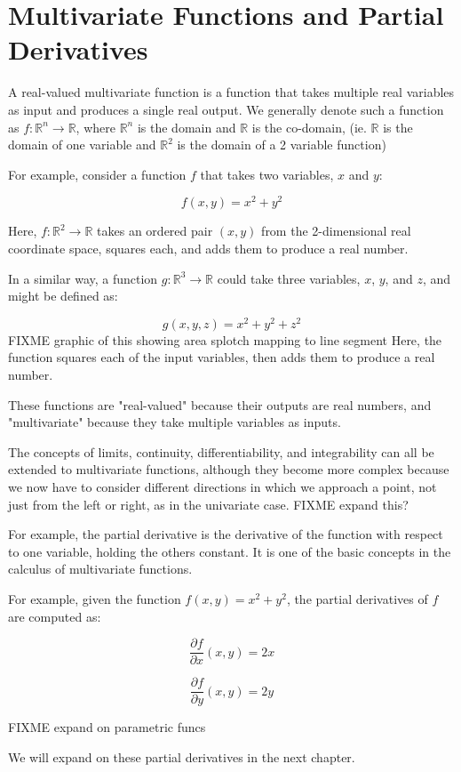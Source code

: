 \chapter{Multivariate Functions and Partial Derivatives}

A real-valued multivariate function is a function that takes multiple
real variables as input and produces a single real output.
We generally denote such a function as $f: \mathbb{R}^n \rightarrow
\mathbb{R}$, where $\mathbb{R}^n$ is the domain and $\mathbb{R}$ is
the co-domain, (ie. $\mathbb{R}$ is the domain of one variable and $\mathbb{R}^2$ is the domain of a 2 variable function)

For example, consider a function $f$ that takes two variables, $x$ and
$y$:

\begin{equation*}
f(x, y) = x^2 + y^2
\end{equation*}

Here, $f: \mathbb{R}^2 \rightarrow \mathbb{R}$ takes an ordered pair
$(x, y)$ from the 2-dimensional real coordinate space, squares each,
and adds them to produce a real number.

In a similar way, a function $g: \mathbb{R}^3 \rightarrow \mathbb{R}$
could take three variables, $x$, $y$, and $z$, and might be defined as:

\begin{equation*}
g(x, y,z) = x^2 + y^2 + z^2
\end{equation*}
FIXME graphic of this showing area splotch mapping to line segment
Here, the function squares each of the input variables, then adds
them to produce a real number.

These functions are "real-valued" because their outputs are real
numbers, and "multivariate" because they take multiple variables as
inputs.

The concepts of limits, continuity, differentiability, and
integrability can all be extended to multivariate functions, although
they become more complex because we now have to consider different
directions in which we approach a point, not just from the left or
right, as in the univariate case. FIXME expand this?

For example, the partial derivative
is the derivative of the function with respect to one variable,
holding the others constant. It is one of the basic concepts in the
calculus of multivariate functions.

For example, given the function $f(x, y) = x^2 + y^2$, the partial
derivatives of $f$ are computed as:

\begin{equation*}
\frac{\partial f}{\partial x}(x, y) = 2x
\end{equation*}

\begin{equation*}
\frac{\partial f}{\partial y}(x, y) = 2y
\end{equation*}

FIXME expand on parametric funcs

We will expand on these partial derivatives in the next chapter. 